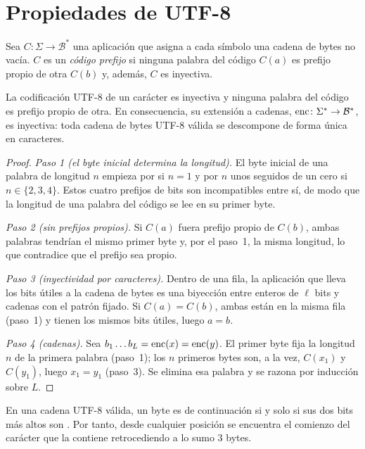 \section{Propiedades de UTF-8}

\begin{definicion}
Sea $C\colon\Sigma\to\mathcal{B}^{*}$ una aplicación que asigna a cada símbolo una cadena de bytes no vacía. $C$ es un \emph{código prefijo} si ninguna palabra del código $C(a)$ es prefijo propio de otra $C(b)$ y, además, $C$ es inyectiva.
\end{definicion}

\begin{teorema}\label{teo:prefijo}
La codificación UTF-8 de un carácter es inyectiva y ninguna palabra del código es prefijo propio de otra. En consecuencia, su extensión a cadenas, $\operatorname{enc}\colon\Sigma^{*}\to\mathcal{B}^{*}$, es inyectiva: toda cadena de bytes UTF-8 válida se descompone de forma única en caracteres.
\end{teorema}

\begin{proof}
\emph{Paso 1 (el byte inicial determina la longitud).} El byte inicial de una palabra de longitud $n$ empieza por  si $n=1$ y por $n$ unos seguidos de un cero si $n\in\{2,3,4\}$. Estos cuatro prefijos de bits son incompatibles entre sí, de modo que la longitud de una palabra del código se lee en su primer byte.

\emph{Paso 2 (sin prefijos propios).} Si $C(a)$ fuera prefijo propio de $C(b)$, ambas palabras tendrían el mismo primer byte y, por el paso~1, la misma longitud, lo que contradice que el prefijo sea propio.

\emph{Paso 3 (inyectividad por caracteres).} Dentro de una fila, la aplicación que lleva los bits útiles a la cadena de bytes es una biyección entre enteros de $\ell$ bits y cadenas con el patrón fijado. Si $C(a)=C(b)$, ambas están en la misma fila (paso~1) y tienen los mismos bits útiles, luego $a=b$.

\emph{Paso 4 (cadenas).} Sea $b_1\dots b_L=\operatorname{enc}(x)=\operatorname{enc}(y)$. El primer byte fija la longitud $n$ de la primera palabra (paso~1); los $n$ primeros bytes son, a la vez, $C(x_1)$ y $C(y_1)$, luego $x_1=y_1$ (paso~3). Se elimina esa palabra y se razona por inducción sobre $L$.
\end{proof}

\begin{proposicion}[Autosincronización]\label{prop:autosinc}
En una cadena UTF-8 válida, un byte es de continuación si y solo si sus dos bits más altos son . Por tanto, desde cualquier posición se encuentra el comienzo del carácter que la contiene retrocediendo a lo sumo 3 bytes.
\end{proposicion}

